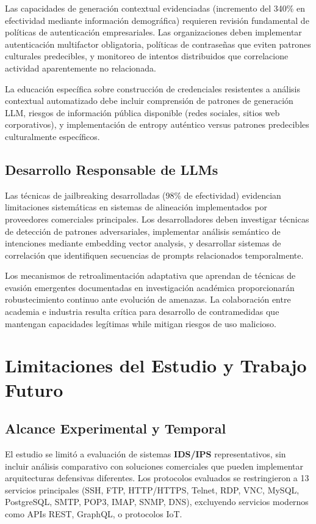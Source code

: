 Las capacidades de generación contextual evidenciadas (incremento del 340\% en efectividad mediante información demográfica) requieren revisión fundamental de políticas de autenticación empresariales. Las organizaciones deben implementar autenticación multifactor obligatoria, políticas de contraseñas que eviten patrones culturales predecibles, y monitoreo de intentos distribuidos que correlacione actividad aparentemente no relacionada.

La educación específica sobre construcción de credenciales resistentes a análisis contextual automatizado debe incluir comprensión de patrones de generación LLM, riesgos de información pública disponible (redes sociales, sitios web corporativos), y implementación de entropy auténtico versus patrones predecibles culturalmente específicos.

\subsection{Desarrollo Responsable de LLMs}

Las técnicas de jailbreaking desarrolladas (98\% de efectividad) evidencian limitaciones sistemáticas en sistemas de alineación implementados por proveedores comerciales principales. Los desarrolladores deben investigar técnicas de detección de patrones adversariales, implementar análisis semántico de intenciones mediante embedding vector analysis, y desarrollar sistemas de correlación que identifiquen secuencias de prompts relacionados temporalmente.

Los mecanismos de retroalimentación adaptativa que aprendan de técnicas de evasión emergentes documentadas en investigación académica proporcionarán robustecimiento continuo ante evolución de amenazas. La colaboración entre academia e industria resulta crítica para desarrollo de contramedidas que mantengan capacidades legítimas while mitigan riesgos de uso malicioso.

\section{Limitaciones del Estudio y Trabajo Futuro}

\subsection{Alcance Experimental y Temporal}

El estudio se limitó a evaluación de sistemas \textbf{IDS/IPS} representativos, sin incluir análisis comparativo con soluciones comerciales que pueden implementar arquitecturas defensivas diferentes. Los protocolos evaluados se restringieron a 13 servicios principales (SSH, FTP, HTTP/HTTPS, Telnet, RDP, VNC, MySQL, PostgreSQL, SMTP, POP3, IMAP, SNMP, DNS), excluyendo servicios modernos como APIs REST, GraphQL, o protocolos IoT.

